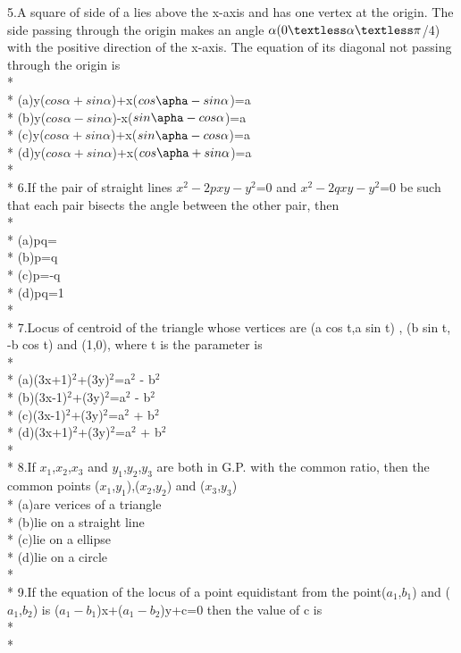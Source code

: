 \documentclass{article}
\begin{document}
{5.\enspace A square of side of a lies above the x-axis and has one vertex at the origin. The side passing through the origin makes an angle $\alpha(0\textless\alpha\textless\pi$/4) with the positive direction of the x-axis. The equation of its diagonal not passing through the origin is\\*\\*
(a)\enspace y($cos\alpha+sin\alpha$)+x($cos\apha-sin\alpha$)=a\\*
(b)\enspace y($cos\alpha-sin\alpha$)-x($sin\apha-cos\alpha$)=a\\*
(c)\enspace y($cos\alpha+sin\alpha$)+x($sin\apha-cos\alpha$)=a\\*
(d)\enspace y($cos\alpha+sin\alpha$)+x($cos\apha+sin\alpha$)=a\\*\\*
6.\enspace If the pair of straight lines $x^2-2pxy-y^2$=0 and $x^2-2qxy-y^2$=0 be such that each pair bisects the angle between the other pair, then\\*\\*
(a)\enspace pq=\\*
(b)\enspace p=q\\*
(c)\enspace p=\enspace-q\\*
(d)\enspace pq=1\\*\\*
7.\enspace Locus of centroid of the triangle whose vertices are (a cos t,a sin t) , (b sin t, -b cos t) and (1,0), where t is the parameter is\\*\\*
(a)\enspace (3x+1)$^2$+(3y)$^2$=\enspace a$^2$ - b$^2$\\*
(b)\enspace (3x-1)$^2$+(3y)$^2$=\enspace a$^2$ - b$^2$\\*
(c)\enspace (3x-1)$^2$+(3y)$^2$=\enspace a$^2$ + b$^2$\\*
(d)\enspace (3x+1)$^2$+(3y)$^2$=\enspace a$^2$ + b$^2$\\*\\*
8.\enspace If $x_1$,$x_2$,$x_3$ and $y_1$,$y_2$,$y_3$ are both in G.P. with the common ratio, then the common points ($x_1$,$y_1$),($x_2$,$y_2$) and ($x_3$,$y_3$)\\*
(a)\enspace are verices of a triangle\\*
(b)\enspace lie on a straight line\\*
(c)\enspace lie on a ellipse\\*
(d)\enspace lie on a circle\\*\\*
9.\enspace If the equation of the locus of a point equidistant from the point($a_1$,$b_1$) and ($a_1$,$b_2$) is ($a_1-b_1$)x+($a_1-b_2$)y+c=0 then the value of c is\\*\\*
}
\end{document}
